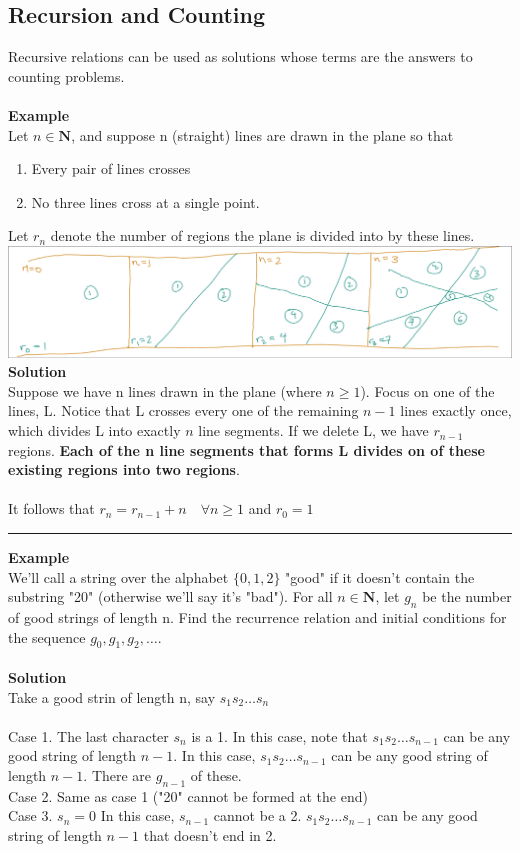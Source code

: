 \documentclass[12pt]{article}
\begin{document}
	\subsection{Recursion and Counting}
	Recursive relations can be used as solutions whose terms are the answers to counting problems. \\\\
	\textbf{Example}\\
	Let $n \in \mathbf{N}$, and suppose n (straight) lines are drawn in the plane so that
	\begin{enumerate}
		\item Every pair of lines crosses
		\item No three lines cross at a single point.
	\end{enumerate}
	Let $r_n$ denote the number of regions the plane is divided into by these lines. \\
	\includegraphics[scale=0.3]{recursion_counting1}\\
	\textbf{Solution}\\
	Suppose we have n lines drawn in the plane (where $n \geq 1$). Focus on one of the lines, L. Notice that L crosses every one of the remaining $n - 1$ lines exactly once, which divides L into exactly $n$ line segments.
	If we delete L, we have $r_{n - 1}$ regions. \textbf{Each of the n line segments that forms L divides on of these existing regions into two regions}. \\\\
	It follows that $r_n = r_{n - 1} + n \quad \forall n \geq 1$ and $r_0 = 1$ \\
	\noindent\rule{\textwidth}{1pt}
	\textbf{Example}\\
	We'll call a string over the alphabet $\{0, 1, 2\}$ "good" if it doesn't contain the substring "20" (otherwise we'll say it's "bad"). For all $n \in \mathbf{N}$, let $g_n$ be the number of good strings of length n. Find the recurrence relation and initial conditions for the sequence $g_0, g_1, g_2, \ldots$.\\\\
	\textbf{Solution}\\
	Take a good strin of length n, say $s_1s_2\ldots s_n$ \\\\
	Case 1. The last character $s_n$ is a 1. In this case, note that $s_1s_2\ldots s_{n - 1}$ can be any good string of length $n - 1$. In this case, $s_1s_2\ldots s_{n - 1}$ can be any good string of length $n-1$. There are $g_{n-1}$ of these.\\
	Case 2. Same as case 1 ("20" cannot be formed at the end) \\
	Case 3. $s_n = 0$ In this case, $s_{n-1}$ cannot be a 2. $s_1s_2 \ldots s_{n-1}$ can be any good string of length $n-1$ that doesn't end in 2.
\end{document}
